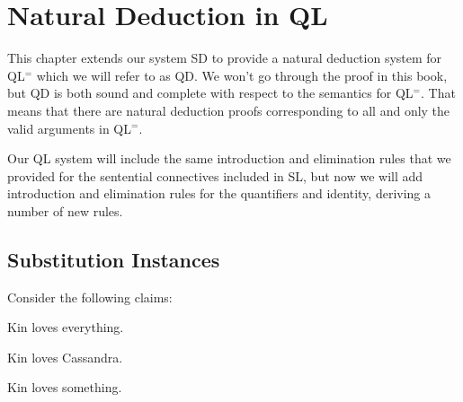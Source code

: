 ﻿%
\chapter{Natural Deduction in QL}
\label{ch.QLND}



This chapter extends our system SD to provide a natural deduction system for QL$^=$ which we will refer to as QD.
We won't go through the proof in this book, but QD is both sound and complete with respect to the semantics for QL$^=$.
That means that there are natural deduction proofs corresponding to all and only the valid arguments in QL$^=$.

Our QL system will include the same introduction and elimination rules that we provided for the sentential connectives included in SL, but now we will add introduction and elimination rules for the quantifiers and identity, deriving a number of new rules.



\section{Substitution Instances}


Consider the following claims:

\begin{earg}
  \item[\ex{I1}] Kin loves everything.
  \item[\ex{I2}] Kin loves Cassandra.
  \item[\ex{I3}] Kin loves something.
\end{earg}

